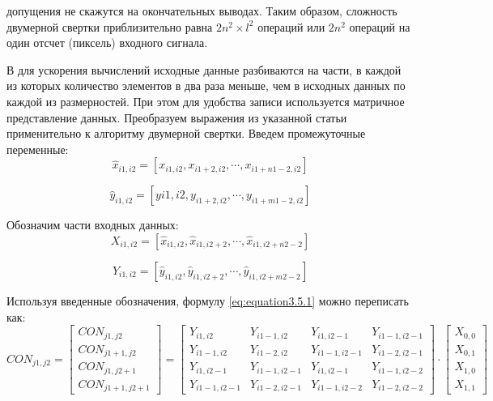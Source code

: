 допущения не скажутся на окончательных выводах. Таким образом, сложность двумерной свертки приблизительно равна $2n^2 \times l^2$ операций или $2n^2$ операций на один отсчет (пиксель) входного сигнала.

В \cite{550562} для ускорения вычислений исходные данные разбиваются на части, в каждой из которых количество элементов в два раза меньше, чем в исходных данных по каждой из размерностей. При этом для удобства записи используется матричное представление данных. Преобразуем выражения из указанной статьи применительно к алгоритму двумерной свертки.
Введем промежуточные переменные:
\begin{equation}
	\label{eq:equation3.5.3}
\hat{x}_{i1,i2} = [x_{i1,i2}, x_{i1+2,i2}, \cdots , x_{i1+n1-2,i2}]
\end{equation}

\begin{equation}
\label{eq:equation3.5.4}
\hat{y}_{i1,i2} = [y{i1,i2}, y_{i1+2,i2}, \cdots , y_{i1+m1-2,i2}]
\end{equation}

Обозначим части входных данных:
\begin{equation}
	\label{eq:equation3.5.5}
X_{i1,i2} = [\hat{x}_{i1,i2}, \hat{x}_{i1,i2+2}, \cdots , \hat{x}_{i1,i2+n2-2}] 
\end{equation}

\begin{equation}
	\label{eq:equation3.5.6}
	Y_{i1,i2} = [\hat{y}_{i1,i2}, \hat{y}_{i1,i2+2}, \cdots , \hat{y}_{i1,i2+m2-2}] 
\end{equation}

Используя введенные обозначения, формулу \ref{eq:equation3.5.1} можно переписать как:
\begin{equation}
	\label{eq:equation3.5.7}
CON_{j1,j2} = 
\begin{bmatrix}
CON_{j1,j2} \\ CON_{j1+1,j2} \\ CON_{j1,j2+1} \\ CON_{j1+1,j2+1}	
\end{bmatrix}
= \begin{bmatrix}
Y_{i1,i2} & Y_{i1-1,i2} & Y_{i1,i2-1} & Y_{i1-1,i2-1} \\
Y_{i1-1,i2} & Y_{i1-2,i2} & Y_{i1-1,i2-1} & Y_{i1-2,i2-1} \\
Y_{i1,i2-1}  & Y_{i1-1,i2-1}  & Y_{i1,i2-1} & Y_{i1-1,i2-2}  \\
Y_{i1-1,i2-1} & Y_{i1-2,i2-1} & Y_{i1-1,i2-2} & Y_{i1-2,i2-2} 	
\end{bmatrix}
\cdot
\begin{bmatrix}
X_{0,0} \\ X_{0,1} \\ X_{1,0} \\ X_{1,1}	
\end{bmatrix}		
\end{equation}


